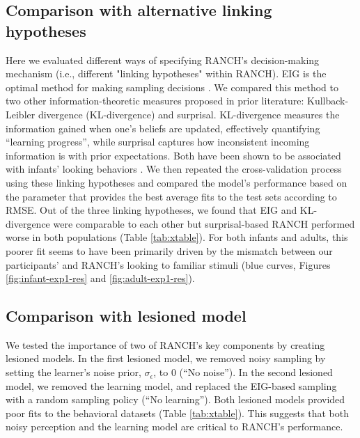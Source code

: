 \documentclass[
]{article}
\begin{document}
\hypertarget{comparison-with-alternative-linking-hypotheses}{%
\subsection{Comparison with alternative linking hypotheses}\label{comparison-with-alternative-linking-hypotheses}}
Here we evaluated different ways of specifying RANCH's decision-making mechanism (i.e., different "linking hypotheses" within RANCH). EIG is the optimal method for making sampling decisions \autocite{lindley1956measure}. We compared this method to two other information-theoretic measures proposed in prior literature: Kullback-Leibler divergence (KL-divergence) and surprisal. KL-divergence measures the information gained when one's beliefs are updated, effectively quantifying ``learning progress'', while surprisal captures how inconsistent incoming information is with prior expectations. Both have been shown to be associated with infants' looking behaviors \autocite{kidd2012goldilocks,poli2020infants}. We then repeated the cross-validation process using these linking hypotheses and compared the model's performance based on the parameter that provides the best average fits to the test sets according to RMSE. Out of the three linking hypotheses, we found that EIG and KL-divergence were comparable to each other but surprisal-based RANCH performed worse in both populations (Table \ref{tab:xtable}). For both infants and adults, this poorer fit seems to have been primarily driven by the mismatch between our participants' and RANCH's looking to familiar stimuli (blue curves, Figures \ref{fig:infant-exp1-res} and \ref{fig:adult-exp1-res}). 

\hypertarget{comparison-with-lesioned-model}{%
\subsection{Comparison with lesioned model}\label{comparison-with-lesioned-model}}

We tested the importance of two of RANCH's key components by creating lesioned models. In the first lesioned model, we removed noisy sampling by setting the learner's noise prior, \(\sigma_{\epsilon}\), to 0  (``No noise''). In the second lesioned model, we removed the learning model, and replaced the EIG-based sampling with a random sampling policy (``No learning''). Both lesioned models provided poor fits to the behavioral datasets (Table \ref{tab:xtable}). This suggests that both  noisy perception and the learning model are critical to RANCH's performance.
\end{document}
